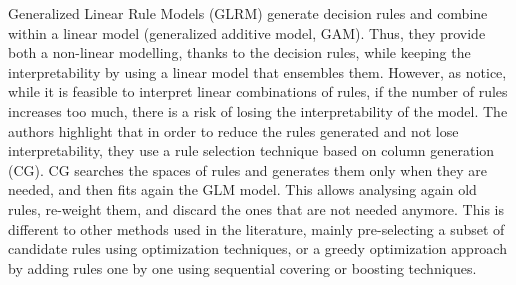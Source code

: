 Generalized Linear Rule Models (GLRM) \parencite{pmlr-v97-wei19a} generate decision rules and combine within a linear model (generalized additive model, GAM). Thus, they provide both a non-linear modelling, thanks to the decision rules, while keeping the interpretability by using a linear model that ensembles them. However, as \parencite{arya2019one} notice, while it is feasible to interpret linear combinations of rules, if the number of rules increases too much, there is a risk of losing the interpretability of the model. The authors highlight that in order to reduce the rules generated and not lose interpretability, they use a rule selection technique based on column generation (CG). CG searches the spaces of rules and generates them only when they are needed, and then fits again the GLM model. This allows analysing again old rules, re-weight them, and discard the ones that are not needed anymore. This is different to other methods used in the literature, mainly pre-selecting a subset of candidate rules using optimization techniques, or a greedy optimization approach by adding rules one by one using sequential covering or boosting techniques.

